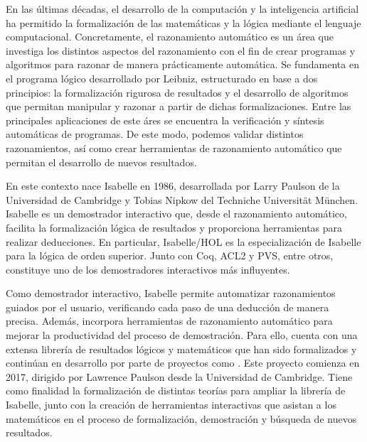 \begin{isabellebody}
\begin{isamarkuptext}
	En las últimas décadas, el desarrollo de la computación y la 
  inteligencia artificial ha permitido la formalización de las 
  matemáticas y la lógica mediante el lenguaje computacional. 
  Concretamente, el razonamiento automático es un área que investiga los
  distintos aspectos del razonamiento con el fin de crear programas y
  algoritmos para razonar de manera prácticamente automática.
  Se fundamenta en el programa lógico desarrollado por Leibniz,
  estructurado en base a dos principios: la formalización rigurosa
  de resultados y el desarrollo de algoritmos que permitan manipular
  y razonar a partir de dichas formalizaciones. Entre las principales 
  aplicaciones de este áres se encuentra la verificación y síntesis 
  automáticas de programas. De este modo, podemos validar distintos 
  razonamientos, así como crear herramientas de razonamiento automático 
  que permitan el desarrollo de nuevos resultados.

  En este contexto nace Isabelle en 1986, desarrollada por Larry Paulson 
  de la Universidad de Cambridge y Tobias Nipkow del Techniche 
  Universität München. Isabelle es un demostrador interactivo que,
  desde el razonamiento automático, facilita la formalización lógica de 
  resultados y proporciona herramientas para realizar deducciones. En 
  particular, Isabelle/HOL es la especialización de Isabelle para la 
  lógica de orden superior. Junto con Coq, ACL2 y PVS, entre
  otros, constituye uno de los demostradores interactivos más 
  influyentes.

  Como demostrador interactivo, Isabelle permite automatizar 
  razonamientos guiados por el usuario, verificando cada paso de una 
  deducción de manera precisa. Además, incorpora herramientas de 
  razonamiento automático para mejorar la productividad del proceso de 
  demostración. Para ello, cuenta con una extensa librería de resultados 
  lógicos y matemáticos que han sido formalizados y continúan en 
  desarrollo por parte de proyectos como . Este proyecto 
  comienza en 2017, dirigido por Lawrence Paulson desde la Universidad 
  de Cambridge. Tiene como finalidad la formalización de distintas 
  teorías para ampliar la librería de Isabelle, junto con la creación de 
  herramientas interactivas que asistan a los matemáticos en el proceso 
  de formalización, demostración y búsqueda de nuevos resultados. 



\end{isamarkuptext}
\end{isabellebody}
